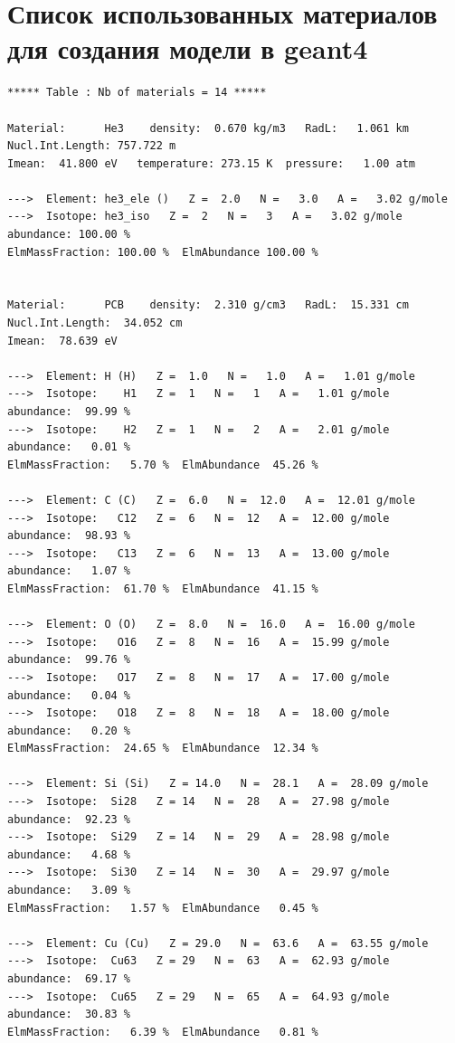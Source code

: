 \section{Список использованных материалов для создания модели в geant4}

\label{list:geamtmaterials}
\tiny{
\begin{verbatim}
***** Table : Nb of materials = 14 *****

Material:      He3    density:  0.670 kg/m3   RadL:   1.061 km   Nucl.Int.Length: 757.722 m  
Imean:  41.800 eV   temperature: 273.15 K  pressure:   1.00 atm

--->  Element: he3_ele ()   Z =  2.0   N =   3.0   A =   3.02 g/mole
--->  Isotope: he3_iso   Z =  2   N =   3   A =   3.02 g/mole   abundance: 100.00 %
ElmMassFraction: 100.00 %  ElmAbundance 100.00 % 


Material:      PCB    density:  2.310 g/cm3   RadL:  15.331 cm   Nucl.Int.Length:  34.052 cm 
Imean:  78.639 eV 

--->  Element: H (H)   Z =  1.0   N =   1.0   A =   1.01 g/mole
--->  Isotope:    H1   Z =  1   N =   1   A =   1.01 g/mole   abundance:  99.99 %
--->  Isotope:    H2   Z =  1   N =   2   A =   2.01 g/mole   abundance:   0.01 %
ElmMassFraction:   5.70 %  ElmAbundance  45.26 % 

--->  Element: C (C)   Z =  6.0   N =  12.0   A =  12.01 g/mole
--->  Isotope:   C12   Z =  6   N =  12   A =  12.00 g/mole   abundance:  98.93 %
--->  Isotope:   C13   Z =  6   N =  13   A =  13.00 g/mole   abundance:   1.07 %
ElmMassFraction:  61.70 %  ElmAbundance  41.15 % 

--->  Element: O (O)   Z =  8.0   N =  16.0   A =  16.00 g/mole
--->  Isotope:   O16   Z =  8   N =  16   A =  15.99 g/mole   abundance:  99.76 %
--->  Isotope:   O17   Z =  8   N =  17   A =  17.00 g/mole   abundance:   0.04 %
--->  Isotope:   O18   Z =  8   N =  18   A =  18.00 g/mole   abundance:   0.20 %
ElmMassFraction:  24.65 %  ElmAbundance  12.34 % 

--->  Element: Si (Si)   Z = 14.0   N =  28.1   A =  28.09 g/mole
--->  Isotope:  Si28   Z = 14   N =  28   A =  27.98 g/mole   abundance:  92.23 %
--->  Isotope:  Si29   Z = 14   N =  29   A =  28.98 g/mole   abundance:   4.68 %
--->  Isotope:  Si30   Z = 14   N =  30   A =  29.97 g/mole   abundance:   3.09 %
ElmMassFraction:   1.57 %  ElmAbundance   0.45 % 

--->  Element: Cu (Cu)   Z = 29.0   N =  63.6   A =  63.55 g/mole
--->  Isotope:  Cu63   Z = 29   N =  63   A =  62.93 g/mole   abundance:  69.17 %
--->  Isotope:  Cu65   Z = 29   N =  65   A =  64.93 g/mole   abundance:  30.83 %
ElmMassFraction:   6.39 %  ElmAbundance   0.81 % 



\end{verbatim}}
